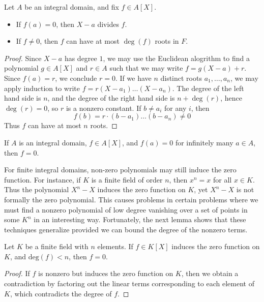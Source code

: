 \begin{theorem}
    Let $A$ be an integral domain, and fix $f \in A[X]$.
    \begin{itemize}
        \item If $f(a) = 0$, then $X - a$ divides $f$.
        \item If $f \neq 0$, then $f$ can have at most $\deg(f)$ roots in $F$.
    \end{itemize}
\end{theorem}
\begin{proof}
    Since $X - a$ has degree $1$, we may use the Euclidean alogrithm to find a polynomial $g \in A[X]$ and $r \in A$ such that we may write $f = g (X - a) + r$. Since $f(a) = r$, we conclude $r = 0$. If we have $n$ distinct roots $a_1, \dots, a_n$, we may apply induction to write $f = r(X - a_1) \dots (X - a_n)$. The degree of the left hand side is $n$, and the degree of the right hand side is $n + \deg(r)$, hence $\deg(r) = 0$, so $r$ is a nonzero constant. If $b \neq a_i$ for any $i$, then
    \[ f(b) = r \cdot (b - a_1) \dots (b - a_n) \neq 0 \]
    Thus $f$ can have at most $n$ roots.
\end{proof}

\begin{corollary}
    If $A$ is an integral domain, $f \in A[X]$, and $f(a) = 0$ for infinitely many $a \in A$, then $f = 0$.
\end{corollary}

For finite integral domains, non-zero polynomials may still induce the zero function. For instance, if $K$ is a finite field of order $n$, then $x^n = x$ for all $x \in K$. Thus the polynomial $X^n - X$ induces the zero function on $K$, yet $X^n - X$ is not formally the zero polynomial. This causes problems in certain problems where we must find a nonzero polynomial of low degree vanishing over a set of points in some $K^n$ in an interesting way. Fortunately, the next lemma shows that these techniques generalize provided we can bound the degree of the nonzero terms.

\begin{lemma}
    Let $K$ be a finite field with $n$ elements. If $f \in K[X]$ induces the zero function on $K$, and $\text{deg}(f) < n$, then $f = 0$.
\end{lemma}
\begin{proof}
    If $f$ is nonzero but induces the zero function on $K$, then we obtain a contradiction by factoring out the linear terms corresponding to each element of $K$, which contradicts the degree of $f$.
\end{proof}


